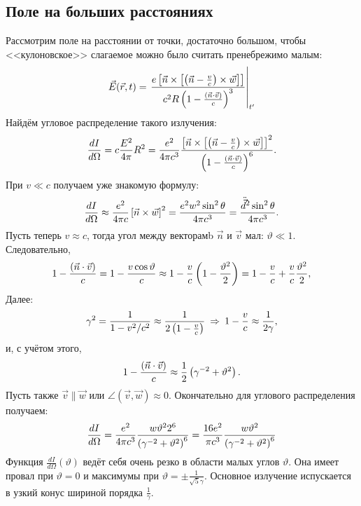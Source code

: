 \subsection{Поле на больших расстояниях}
    Рассмотрим поле на расстоянии от точки, достаточно большом, чтобы <<кулоновское>> слагаемое можно было считать пренебрежимо малым:
    \begin{equation*}
        \vec{E}(\vec{r}, t) = \left. \frac{e\left[{\vec{n} \times \left[{\left({\vec{n} - \frac{v}{c}}\right) \times \vec{w}}\right]}\right]}{c^2R\left({1 - \frac{\left({\vec{n}\cdot\vec{v}}\right)}{c}}\right)^3} \right|_{t'}
    \end{equation*}
    Найдём угловое распределение такого излучения:
    \begin{gather*}
        \frac{dI}{d\Omega} = c\frac{E^2}{4\pi}R^2 = \frac{e^2}{4\pi c^3}
        \frac{\left[{\vec{n} \times \left[{\left({\vec{n} - \frac{v}{c}}\right) \times \vec{w}}\right]}\right]^2}{\left({1 - \frac{\left({\vec{n}\cdot\vec{v}}\right)}{c}}\right)^6}.
    \end{gather*}
    При $v \ll c$ получаем уже знакомую формулу:
    \begin{equation*}
        \frac{dI}{d\Omega} \approx \frac{e^2}{4\pi c} \left[{\vec n\times\vec w}\right]^2 = \frac{e^2w^2\sin^2\theta}{4\pi c^3} = \frac{\ddot{\vec{d}}^2\sin^2\theta}{4\pi c^3}.
    \end{equation*}
    Пусть теперь $v \approx c$, тогда угол между векторамb $\vec{n}$ и $\vec{v}$ мал: $\vartheta \ll 1$. Следовательно,
    \begin{gather*}
        1 - \frac{\left({\vec{n}\cdot\vec{v}}\right)}{c} = 1 - \frac{v \cos\vartheta}{c}  \approx 1 - \frac vc \left({1 - \frac{\vartheta^2}{2}}\right) = 1 - \frac vc + \frac vc \frac{\vartheta^2}2,
    \end{gather*}
    Далее:
    \begin{gather*}
        \gamma^2 = \frac{1}{1 - v^2 / c^2} \approx \frac{1}{2\left({1 - \frac vc}\right)} \: \Rightarrow \: 1 - \frac vc \approx \frac{1}{2\gamma},
    \end{gather*}
    и, с учётом этого,
    \begin{equation*}
        1 - \frac{\left({\vec{n}\cdot\vec{v}}\right)}{c} \approx \frac 12 \left({\gamma^{-2} + \vartheta^2}\right).
    \end{equation*}
    Пусть также $\vec{v} \parallel \vec{w}$ или $\angle(\vec{v}, \vec{w}) \approx 0$. Окончательно для углового распределения получаем:
    \begin{equation*}
        \frac{dI}{d\Omega} = \frac{e^2}{4\pi c^3} \frac{w\vartheta^22^6}{\left({\gamma^{-2} + \vartheta^2}\right)^6} = \frac{16e^2}{\pi c^3} \frac{w\vartheta^2}{\left({\gamma^{-2} + \vartheta^2}\right)^6}
    \end{equation*}
    Функция $\frac{dI}{d\Omega}(\vartheta)$ ведёт себя очень резко в области малых углов $\vartheta$. Она имеет провал при $\vartheta = 0$ и максимумы при
    $\vartheta = \pm \frac{1}{\sqrt{5}\gamma}$. Основное излучение испускается в узкий конус шириной порядка $\frac{1}{\gamma}$.

